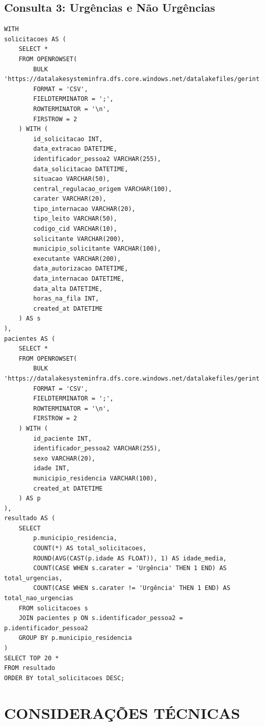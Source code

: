 \documentclass[12pt,a4paper]{article}
\begin{document}
\subsection{Consulta 3: Urgências e Não Urgências}

\begin{lstlisting}[style=sqlstyle, caption=Urgências e Não Urgências]
WITH 
solicitacoes AS (
    SELECT *
    FROM OPENROWSET(
        BULK 'https://datalakesysteminfra.dfs.core.windows.net/datalakefiles/gerint.solicitacoes_internacao.txt',
        FORMAT = 'CSV',
        FIELDTERMINATOR = ';',
        ROWTERMINATOR = '\n',
        FIRSTROW = 2
    ) WITH (
        id_solicitacao INT,
        data_extracao DATETIME,
        identificador_pessoa2 VARCHAR(255),
        data_solicitacao DATETIME,
        situacao VARCHAR(50),
        central_regulacao_origem VARCHAR(100),
        carater VARCHAR(20),
        tipo_internacao VARCHAR(20),
        tipo_leito VARCHAR(50),
        codigo_cid VARCHAR(10),
        solicitante VARCHAR(200),
        municipio_solicitante VARCHAR(100),
        executante VARCHAR(200),
        data_autorizacao DATETIME,
        data_internacao DATETIME,
        data_alta DATETIME,
        horas_na_fila INT,
        created_at DATETIME
    ) AS s
),
pacientes AS (
    SELECT *
    FROM OPENROWSET(
        BULK 'https://datalakesysteminfra.dfs.core.windows.net/datalakefiles/gerint.pacientes.txt',
        FORMAT = 'CSV',
        FIELDTERMINATOR = ';',
        ROWTERMINATOR = '\n',
        FIRSTROW = 2
    ) WITH (
        id_paciente INT,
        identificador_pessoa2 VARCHAR(255),
        sexo VARCHAR(20),
        idade INT,
        municipio_residencia VARCHAR(100),
        created_at DATETIME
    ) AS p
),
resultado AS (
    SELECT 
        p.municipio_residencia,
        COUNT(*) AS total_solicitacoes,
        ROUND(AVG(CAST(p.idade AS FLOAT)), 1) AS idade_media,
        COUNT(CASE WHEN s.carater = 'Urgência' THEN 1 END) AS total_urgencias,
        COUNT(CASE WHEN s.carater != 'Urgência' THEN 1 END) AS total_nao_urgencias
    FROM solicitacoes s
    JOIN pacientes p ON s.identificador_pessoa2 = p.identificador_pessoa2
    GROUP BY p.municipio_residencia
)
SELECT TOP 20 *
FROM resultado
ORDER BY total_solicitacoes DESC;

\end{lstlisting}

\section{CONSIDERAÇÕES TÉCNICAS}
\end{document}
